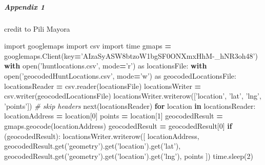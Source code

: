 \documentclass[]{article}
\newenvironment{Shaded}{\begin{snugshade}}{\end{snugshade}}
\newcommand{\KeywordTok}[1]{\textcolor[rgb]{0.13,0.29,0.53}{\textbf{#1}}}
\newcommand{\DecValTok}[1]{\textcolor[rgb]{0.00,0.00,0.81}{#1}}
\newcommand{\StringTok}[1]{\textcolor[rgb]{0.31,0.60,0.02}{#1}}
\newcommand{\ImportTok}[1]{#1}
\newcommand{\CommentTok}[1]{\textcolor[rgb]{0.56,0.35,0.01}{\textit{#1}}}
\newcommand{\ControlFlowTok}[1]{\textcolor[rgb]{0.13,0.29,0.53}{\textbf{#1}}}
\newcommand{\OperatorTok}[1]{\textcolor[rgb]{0.81,0.36,0.00}{\textbf{#1}}}
\newcommand{\BuiltInTok}[1]{#1}
\newcommand{\NormalTok}[1]{#1}
\let\oldsubparagraph\subparagraph
\renewcommand{\subparagraph}[1]{\oldsubparagraph{#1}\mbox{}}
\begin{document}
\subparagraph{Appendix 1}\label{appendix-1}

credit to Pili Mayora

\begin{Shaded}
\begin{Highlighting}[]
\ImportTok{import}\NormalTok{ googlemaps}
\ImportTok{import}\NormalTok{ csv}
\ImportTok{import}\NormalTok{ time}
\NormalTok{gmaps }\OperatorTok{=}\NormalTok{ googlemaps.Client(key}\OperatorTok{=}\StringTok{'AIzaSyASW8btzoW1bgSF0ONXmxHhM-_hNR3oh48'}\NormalTok{)}
\ControlFlowTok{with} \BuiltInTok{open}\NormalTok{(}\StringTok{'huntlocations.csv'}\NormalTok{, mode}\OperatorTok{=}\StringTok{'r'}\NormalTok{) }\ImportTok{as}\NormalTok{ locationsFile:}
    \ControlFlowTok{with} \BuiltInTok{open}\NormalTok{(}\StringTok{'geocodedHuntLocations.csv'}\NormalTok{, mode}\OperatorTok{=}\StringTok{'w'}\NormalTok{) }\ImportTok{as}\NormalTok{ geocodedLocationsFile:}
\NormalTok{        locationsReader }\OperatorTok{=}\NormalTok{ csv.reader(locationsFile)}
\NormalTok{        locationsWriter }\OperatorTok{=}\NormalTok{ csv.writer(geocodedLocationsFile)}
\NormalTok{        locationsWriter.writerow([}\StringTok{'location'}\NormalTok{, }\StringTok{'lat'}\NormalTok{, }\StringTok{'lng'}\NormalTok{, }\StringTok{'points'}\NormalTok{])}
        \CommentTok{# skip headers}
        \BuiltInTok{next}\NormalTok{(locationsReader)}
        \ControlFlowTok{for}\NormalTok{ location }\KeywordTok{in}\NormalTok{ locationsReader:}
\NormalTok{            locationAddress }\OperatorTok{=}\NormalTok{ location[}\DecValTok{0}\NormalTok{]}
\NormalTok{            points }\OperatorTok{=}\NormalTok{ location[}\DecValTok{1}\NormalTok{]}
\NormalTok{            geocodedResult }\OperatorTok{=}\NormalTok{ gmaps.geocode(locationAddress)}
\NormalTok{            geocodedResult }\OperatorTok{=}\NormalTok{ geocodedResult[}\DecValTok{0}\NormalTok{]}
            \ControlFlowTok{if}\NormalTok{ (geocodedResult):}
\NormalTok{                locationsWriter.writerow([}
\NormalTok{                    locationAddress,}
\NormalTok{                    geocodedResult.get(}\StringTok{'geometry'}\NormalTok{).get(}\StringTok{'location'}\NormalTok{).get(}\StringTok{'lat'}\NormalTok{),}
\NormalTok{                    geocodedResult.get(}\StringTok{'geometry'}\NormalTok{).get(}\StringTok{'location'}\NormalTok{).get(}\StringTok{'lng'}\NormalTok{),}
\NormalTok{                    points}
\NormalTok{                ])}
\NormalTok{            time.sleep(}\DecValTok{2}\NormalTok{)}
\end{Highlighting}
\end{Shaded}
\end{document}
